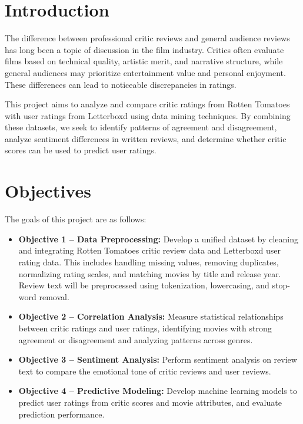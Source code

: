\documentclass[conference]{IEEEtran}
\begin{document}
\section{Introduction}
The difference between professional critic reviews and general audience
reviews has long been a topic of discussion in the film industry. Critics
often evaluate films based on technical quality, artistic merit, and
narrative structure, while general audiences may prioritize entertainment
value and personal enjoyment. These differences can lead to noticeable
discrepancies in ratings.

This project aims to analyze and compare critic ratings from Rotten Tomatoes
with user ratings from Letterboxd using data mining techniques. By combining
these datasets, we seek to identify patterns of agreement and disagreement,
analyze sentiment differences in written reviews, and determine whether
critic scores can be used to predict user ratings.

\section{Objectives}

The goals of this project are as follows:

\begin{itemize}

  \item \textbf{Objective 1 -- Data Preprocessing:}
        Develop a unified dataset by cleaning and integrating Rotten Tomatoes
        critic review data and Letterboxd user rating data. This includes handling
        missing values, removing duplicates, normalizing rating scales, and matching
        movies by title and release year. Review text will be preprocessed using
        tokenization, lowercasing, and stop-word removal.

  \item \textbf{Objective 2 -- Correlation Analysis:}
        Measure statistical relationships between critic ratings and user ratings,
        identifying movies with strong agreement or disagreement and analyzing
        patterns across genres.

  \item \textbf{Objective 3 -- Sentiment Analysis:}
        Perform sentiment analysis on review text to compare the emotional tone of
        critic reviews and user reviews.

  \item \textbf{Objective 4 -- Predictive Modeling:}
        Develop machine learning models to predict user ratings from critic scores
        and movie attributes, and evaluate prediction performance.

\end{itemize}
\end{document}
